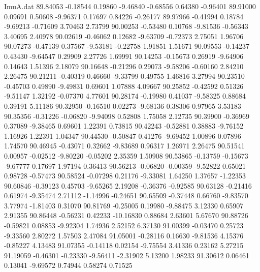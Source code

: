 \begin{filecontents}{ImuA.dat}
  89.84053   -0.18544    0.19860   -9.46840   -0.68556    0.64380   -0.96401
  89.91000    0.09691    0.50608   -9.96371    0.17697    0.84226   -0.26177
  89.97966   -0.41994    0.18784   -9.69213   -0.71609    3.70463    2.73799
  90.00253   -0.53480    0.10768   -9.81536   -0.56343    3.40695    2.40978
  90.02619   -0.46062    0.12682   -9.63709   -0.72373    2.75051    1.96706
  90.07273   -0.47139    0.37567   -9.53181   -0.22758    1.91851    1.51671
  90.09553   -0.14237    0.43430   -9.64547    0.29909    2.27726    1.69991
  90.14253   -0.15673    0.26919   -9.64906    0.14643    1.51396    2.18079
  90.16648   -0.21296    0.29073   -9.58206   -0.60160    2.84210    2.26475
  90.21211   -0.40319    0.46660   -9.33799    0.49755    1.46816    3.27994
  90.23510   -0.45703    0.49890   -9.49831    0.69601    1.07888    4.09667
  90.25852   -0.42592    0.51326   -9.51147    1.32192   -0.07370    4.77601
  90.28174   -0.19980    0.41037   -9.58325    0.88684    0.39191    5.11186
  90.32950   -0.16510    0.02273   -9.68136    0.38306    0.97965    3.53183
  90.35356   -0.31226   -0.06820   -9.94098    0.52808    1.75058    2.12735
  90.39900   -0.36969    0.37089   -9.38465    0.69601    1.22391    0.73815
  90.42243   -0.52881    0.38883   -9.76152    1.16926    1.22391    1.04347
  90.44530   -0.50847    0.41276   -9.69452    1.00896    0.07896    1.74570
  90.46945   -0.43071    0.32662   -9.83689    0.96317    1.26971    2.26475
  90.51541    0.00957   -0.02512   -9.80220   -0.05202    2.35359    1.50908
  90.53865   -0.13759   -0.15673   -9.67777    0.17697    1.97194    0.36413
  90.56213   -0.06820   -0.00359   -9.52822    0.65021    0.98728   -0.57473
  90.58524   -0.07298    0.21176   -9.33081    1.64250    1.37657   -1.22353
  90.60846   -0.39123    0.45703   -9.65265    2.19208   -0.36376   -0.92585
  90.63128   -0.21416    0.61974   -9.35474    2.71112   -1.14996   -0.24651
  90.65509   -0.37448    0.66760   -9.83570    3.77974   -1.81403    0.31070
  90.81769   -0.25005    0.19980   -9.88475    3.12330    0.65907    2.91355
  90.86448   -0.56231    0.42233  -10.16830    0.88684    2.63601    5.67670
  90.88726   -0.59821    0.08853   -9.92304    1.74936    2.52152    6.37130
  91.00399   -0.03470    0.25723   -9.33560    2.80272    1.57503    2.47084
  91.05001   -0.28116    0.16630   -9.81536    4.15376   -0.85227    4.13483
  91.07355   -0.14118    0.02154   -9.75554    3.41336    0.23162    5.27215
  91.19059   -0.46301   -0.23330   -9.56411   -2.31902    5.13200    1.98233
  91.30612    0.06461    0.13041   -9.69572    0.74944    0.58274    0.71525

\end{filecontents}
